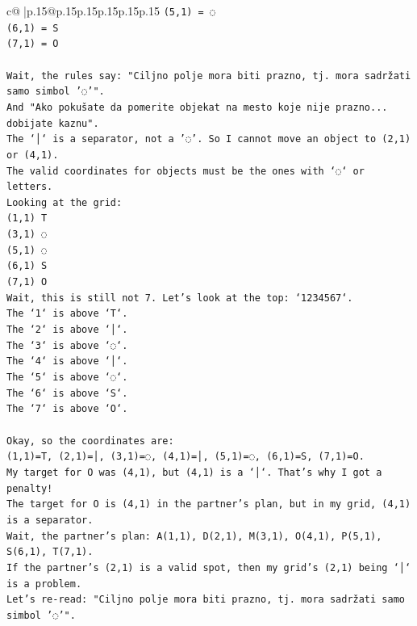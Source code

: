 \documentclass{article}
\begin{document}
{\begin{supertabular}{c@{$\;$}|p{.15\linewidth}@{}p{.15\linewidth}p{.15\linewidth}p{.15\linewidth}p{.15\linewidth}p{.15\linewidth}}
{{{\texttt{(5,1) = ◌} \\
\texttt{(6,1) = S} \\
\texttt{(7,1) = O} \\
\\ 
\texttt{Wait, the rules say: "Ciljno polje mora biti prazno, tj. mora sadržati samo simbol '◌'".} \\
\texttt{And "Ako pokušate da pomerite objekat na mesto koje nije prazno... dobijate kaznu".} \\
\texttt{The `│` is a separator, not a '◌'. So I cannot move an object to (2,1) or (4,1).} \\
\texttt{The valid coordinates for objects must be the ones with `◌` or letters.} \\
\texttt{Looking at the grid:} \\
\texttt{(1,1) T} \\
\texttt{(3,1) ◌} \\
\texttt{(5,1) ◌} \\
\texttt{(6,1) S} \\
\texttt{(7,1) O} \\
\texttt{Wait, this is still not 7. Let's look at the top: `1234567`.} \\
\texttt{The `1` is above `T`.} \\
\texttt{The `2` is above `│`.} \\
\texttt{The `3` is above `◌`.} \\
\texttt{The `4` is above `│`.} \\
\texttt{The `5` is above `◌`.} \\
\texttt{The `6` is above `S`.} \\
\texttt{The `7` is above `O`.} \\
\\ 
\texttt{Okay, so the coordinates are:} \\
\texttt{(1,1)=T, (2,1)=│, (3,1)=◌, (4,1)=│, (5,1)=◌, (6,1)=S, (7,1)=O.} \\
\texttt{My target for O was (4,1), but (4,1) is a `│`. That's why I got a penalty!} \\
\texttt{The target for O is (4,1) in the partner's plan, but in my grid, (4,1) is a separator.} \\
\texttt{Wait, the partner's plan: A(1,1), D(2,1), M(3,1), O(4,1), P(5,1), S(6,1), T(7,1).} \\
\texttt{If the partner's (2,1) is a valid spot, then my grid's (2,1) being `│` is a problem.} \\
\texttt{Let's re{-}read: "Ciljno polje mora biti prazno, tj. mora sadržati samo simbol '◌'".} \\
}}}
\end{supertabular}}
\end{document}
